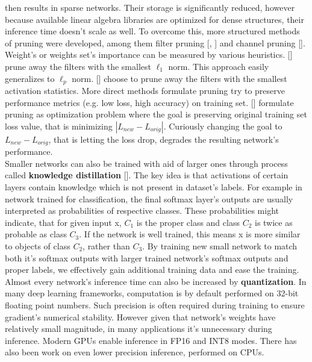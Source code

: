 \documentclass[../Main.tex]{subfiles}
\begin{document}
    then results in sparse networks. Their storage is significantly reduced, however
    because available linear algebra libraries are optimized for dense structures,
    their inference time doesn't scale as well. To overcome this, more structured
    methods of pruning were developed, among them filter pruning [\cite{li2016pruning},
    \cite{molchanov2016pruning}]
    and channel pruning [\cite{he2017channel}]. 
    Weight's or weights set's importance can be measured by various heuristics. 
    [\cite{li2016pruning}] prune away the filters with the smallest $\ell_1$ norm.
    This approach easily generalizes to $\ell_p$ norm.
    [\cite{polyak2015}] choose to prune away the filters with
    the smallest activation statistics. More direct methods formulate pruning 
    try to preserve performance metrics (e.g. low loss, high accuracy) on training set. 
    [\cite{molchanov2016pruning}] formulate pruning as optimization problem where
    the goal is preserving original training set loss value, that is minimizing
    $|L_{new} - L_{orig}|$. Curiously changing the goal to $L_{new} - L_{orig}$,
    that is letting the loss drop, degrades the resulting network's performance.\\
    Smaller networks can also be trained with aid of larger ones through process called
    \textbf{knowledge distillation} [\cite{hinton2015distilling}]. 
    The key idea is that activations of certain layers
    contain knowledge which is not present in dataset's labels. For example in network 
    trained for classification, the final softmax layer's outputs are usually 
    interpreted as probabilities of respective classes. These probabilities might indicate,
    that for given input x, $C_1$ is the proper class and class $C_2$ is twice as probable 
    as class $C_3$. If the network is well trained, this means x is more similar to
    objects of class $C_2$, rather than $C_3$. By training new small network to match both
    it's softmax outputs with larger trained network's softmax outputs and proper labels,
    we effectively gain additional training data and ease the training.
    Almost every network's inference time can also be increased by \textbf{quantization}.
    In many deep learning frameworks, computation is by default performed on
    32-bit floating point numbers. Such precision is often required during training to 
    ensure gradient's numerical stability. However given that network's weights have
    relatively small magnitude, in many applications it's unnecessary during inference.
    Modern GPUs enable inference in FP16 and INT8 modes. There has also been work 
    on even lower precision inference, performed on CPUs. 
    
        


\biblio %
\end{document}
